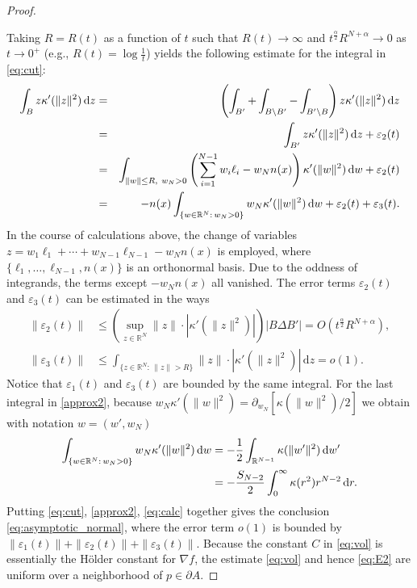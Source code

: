 \documentclass[graybox]{svmult}
\newcommand{\ep}{\varepsilon}
\renewcommand{\d}{\mathrm{d}}  %
\newcommand{\R}{\mathbb{R}}  %
\renewcommand{\AA}{A}  %
\newcommand{\pp}{p}
\begin{document}
\begin{proof}
\begin{figure}[t]
\end{figure}
Taking $R=R(t)$ as a function of $t$ such that $R(t)\to\infty$ and $t^\frac{\alpha}{2}R^{N+\alpha}\to0$ as $t\to0^+$ (e.g., $R(t) =\log\frac1{t}$) yields  the following estimate for the integral in \eqref{eq:cut}: 
\begin{eqnarray}
 \int_{B} z \kappa'(\|z\|^2) \,\d z  \notag
&=& \left( \int_{B'}  + \int_{B\setminus B'} - \int_{B'\setminus B}\right) z \kappa'(\|z\|^2) \,\d z   \notag \\
&=& \int_{B'} z \kappa'(\|z\|^2) \,\d z  + \ep_2(t) \label{approx1}\\
&=&\int_{\|w\|\leq R,~w_N > 0} \left( \sum_{i=1}^{N-1} w_i \ell_i -w_N n(x) \right) \kappa'(\|w\|^2) \,\d w+\ep_2(t) \notag \\
&=& -n(x)\int_{\{w\in \R^N:\, w_N>0\}} w_N \kappa'(\|w\|^2) \,\d w +\ep_2(t) +\ep_3(t).  \label{approx2}
\end{eqnarray}
In the course of calculations above,  the change of variables $z =  w_1 \ell_1 + \cdots +w_{N-1} \ell_{N-1} -w_N n(x)$ is employed, where $\{\ell_1,\dots, \ell_{N-1}, n(x)\}$ is an orthonormal basis. Due to the oddness of integrands, the terms except $-w_N n(x)$ all vanished. The error terms $\ep_2(t)$ and $\ep_3(t)$ can be estimated in the ways 
\begin{align}
\|\ep_2(t)\| &\le \left(\sup_{z \in \R^N  }\|z\| \!\cdot\!  |\kappa'(\|z\|^2)|\right) |B\Delta B'|  =O( t^\frac{\alpha}{2}R^{N+\alpha}), \label{eq:E2} \\ 
\|\ep_3(t)\| &\le \int_{\{z\in\R^N:\,\|z\|>R\}} \|z\|\!\cdot\!  |\kappa'(\|z\|^2)|\,\d z =o(1). \label{eq:E3}
\end{align}
Notice that $\ep_1(t)$ and $\ep_3(t)$ are bounded by the same integral. 
For the last integral in \eqref{approx2}, because $w_N \kappa'(\|w\|^2) = \partial_{w_N} [\kappa(\|w\|^2)/2]$ we obtain with notation $w=(w', w_N)$
\begin{align}
\int_{\{w \in \R^N :\, w_N>0\}} w_N \kappa'(\|w\|^2) \,\d w
&= -\frac1{2}\int_{\R^{N-1}} \kappa(\|w'\|^2) \,\d w'  \notag \\
&= -\frac{S_{N-2}}{2} \int_{0}^\infty \kappa(r^2)r^{N-2}\,\d r. \label{eq:calc}
\end{align}
  Putting \eqref{eq:cut}, \eqref{approx2}, \eqref{eq:calc} together gives the conclusion \eqref{eq:asymptotic_normal}, where the error term $o(1)$ is  bounded by $\|\ep_1(t)\| +\|\ep_2(t)\| +\|\ep_3(t)\|$.  Because the constant $C$ in \eqref{eq:vol} is essentially the H\"older constant for $\nabla f$,  the estimate \eqref{eq:vol} and hence \eqref{eq:E2} are uniform over a neighborhood of $\pp\in \partial\AA$. 
\end{proof}
\end{document}
